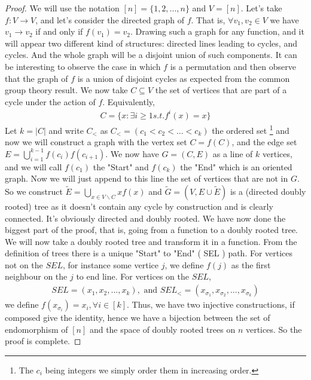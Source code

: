 \begin{proof}
We will use the notation $[n] = \{1, 2, ..., n\}$ and $V = [n]$.
Let's take $f:V \longrightarrow V$, and let's consider the directed graph of $f$. That is, $\forall v_1, v_2 \in V$ we have $v_1 \rightarrow v_2$ if and only if $f(v_1) = v_2$.
Drawing such a graph for any function, and it will appear two different kind of structures: directed lines leading to cycles, and cycles. 
And the whole graph will be a disjoint union of such components.
It can be interesting to observe the case in which $f$ is a permutation and then observe that the graph of $f$ is a union of disjoint cycles as expected from the common group theory result.
\newline
We now take $C \subseteq V$ the set of vertices that are part of a cycle under the action of $f$. Equivalently,
\begin{align*}
    C = \{ x : \exists i \geq 1 s. t. f^i(x) = x \}
\end{align*}
Let $k = |C|$ and write $C_<$ as $C_< = (c_1 < c_2 <...<c_k)$ the ordered set 
\footnote{The $c_i$ being integers we simply order them in increasing order.}
and now we will construct a graph with the vertex set $C = f(C)$, and the edge set $E = \bigcup_{i=1}^{k-1} f(c_i)f(c_{i+1})$. We now have $G=(C, E)$ as a line of $k$ vertices, and we will call $f(c_1)$ the "Start" and $f(c_k)$ the "End" which is an oriented graph.
\newline
Now we will just append to this line the set of vertices that are not in $G$. So we construct $\tilde{E} = \bigcup_{x \in V \backslash C} x f(x)$ and $\tilde{G} = (V, E\cup\tilde{E})$ is a (directed doubly rooted) tree as it doesn't contain any cycle by construction and is clearly connected. It's obviously directed and  doubly rooted.
We have now done the biggest part of the proof, that is, going from a function to a doubly rooted tree.
\newline
We will now take a doubly rooted tree and transform it in a function. From the definition of trees there is a unique "Start" to "End" ( SEL ) path.
\newline
For vertices not on the $SEL$, for instance some vertice $j$, we define $f(j)$ as the first neighbour on the $j$ to end line.
\newline
For vertices on the $SEL$, 
\begin{align}
	SEL = (x_1, x_2, ..., x_k), \text{ and } SEL_< = (x_{\sigma_1}, x_{\sigma_2}, ..., x_{\sigma_k}) 
\end{align}
we define $f(x_{\sigma_i}) = x_i, \forall i \in [k]$.
\newline
Thus, we have two injective constructions, if composed give the identity, hence we have a bijection between the set of endomorphism of $[n]$ and the space of doubly rooted trees on $n$ vertices. So the proof is complete.
\end{proof}
